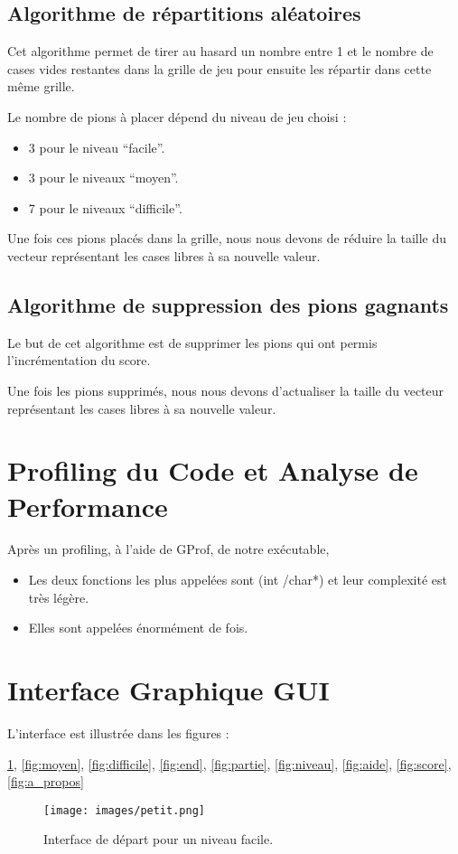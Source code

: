 \documentclass[a4paper, 11pt, oneside]{article}
\begin{document}
\subsection{Algorithme de répartitions aléatoires}
Cet algorithme permet de tirer au hasard un nombre entre 1 et le nombre de cases vides restantes dans la grille de jeu pour ensuite les répartir dans cette même grille.\par
Le nombre de pions à placer dépend du niveau de jeu choisi :
\begin{itemize}
	\item[] 3 pour le niveau ``facile''.
	\item[] 3 pour le niveaux ``moyen''.
	\item[] 7 pour le niveaux ``difficile''.
\end{itemize}
Une fois ces pions placés dans la grille, nous nous devons de réduire la taille du vecteur représentant les cases libres à sa nouvelle valeur.

\subsection{Algorithme de suppression des pions gagnants}
Le but de cet algorithme est de supprimer les pions qui ont permis l'incrémentation du score.\par
Une fois les pions supprimés, nous nous devons d'actualiser la taille du vecteur représentant les cases libres à sa nouvelle valeur.

\section{Profiling du Code et Analyse de Performance}
Après un profiling, à l'aide de GProf, de notre exécutable,

\begin{itemize}
    \item Les deux fonctions les plus appelées sont (int /char*) et leur complexité est très légère.
    \item Elles sont appelées énormément de fois.
\end{itemize}

\section{Interface Graphique GUI}
L'interface est illustrée dans les figures :\par \ref{fig:petit}, \ref{fig:moyen}, \ref{fig:difficile}, \ref{fig:end}, \ref{fig:partie}, \ref{fig:niveau}, \ref{fig:aide}, \ref{fig:score}, \ref{fig:a_propos}
\begin{figure}[!h]
    \centering
    \texttt{[image: images/petit.png]}
    \caption{Interface de départ pour un niveau facile.}
    \label{fig:petit}
\end{figure}
\end{document}
